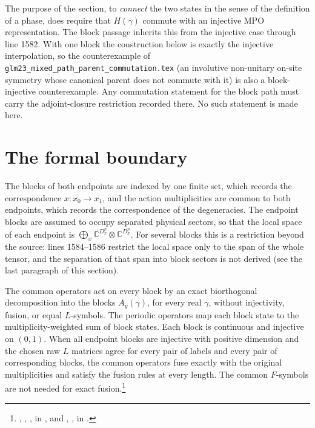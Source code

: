 \documentclass{article}
\begin{document}
The purpose of the section, to \emph{connect} the two states in the sense
of the definition of a phase, does require that $H(\gamma)$ commute with an
injective MPO representation. The block passage inherits this from the
injective case through line 1582. With one block the construction below is
exactly the injective interpolation, so the counterexample of
\texttt{glm23\_mixed\_path\_parent\_commutation.tex} (an involutive
non-unitary on-site symmetry whose canonical parent does not commute with
it) is also a block-injective counterexample. Any commutation statement for
the block path must carry the adjoint-closure restriction recorded there.
No such statement is made here.

\section{The formal boundary}
The blocks of both endpoints are indexed by one finite set, which records
the correspondence $x:x_0\to x_1$, and the action multiplicities are
common to both endpoints, which records the correspondence of the
degeneracies. The endpoint blocks are assumed to occupy separated physical
sectors, so that the local space of each endpoint is
$\bigoplus_x\mathbb C^{D^p_x}\otimes\mathbb C^{D^p_x}$. For several
blocks this is a restriction beyond the source: lines 1584--1586 restrict
the local space only to the span of the whole tensor, and the separation of
that span into block sectors is not derived (see the last paragraph of this
section).

The common operators act on every block by an exact biorthogonal
decomposition into the blocks $A_y(\gamma)$, for every real $\gamma$,
without injectivity, fusion, or equal $L$-symbols. The periodic operators
map each block state to the multiplicity-weighted sum of block states.
Each block is continuous and injective on $(0,1)$. When all endpoint blocks
are injective with positive dimension and the chosen raw $L$ matrices agree
for every pair of labels and every pair of corresponding blocks, the common
operators fuse exactly with the original multiplicities and satisfy the
fusion rules at every length. The common $F$-symbols are not needed for
exact fusion.\footnote{,
    ,
    ,
    in , and
    ,
    ,
    in .}
\end{document}
